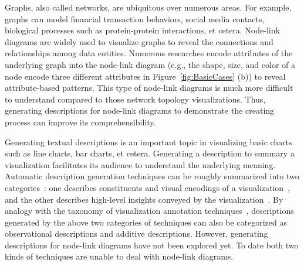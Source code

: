 \maketitle

Graphs, also called networks, are ubiquitous over numerous areas. For example, graphs can model financial transaction behaviors, social media contacts, biological processes such as protein-protein interactions, et cetera.
Node-link diagrams are widely used to visualize graphs to reveal the connections and relationships among data entities.
Numerous researches encode attributes of the underlying graph into the node-link diagram (e.g., the shape, size, and color of a node encode three different attributes in Figure~\ref{fig:BasicCases} (b)) to reveal attribute-based patterns.
This type of node-link diagrams is much more difficult to understand compared to those network topology visualizations. 
Thus, generating descriptions for node-link diagrams to demonstrate the creating process can improve its comprehensibility.

Generating textual descriptions is an important topic in visualizing basic charts such as line charts, bar charts, et cetera.
Generating a description to summary a visualization facilitates its audience to understand the underlying meaning.
Automatic description generation techniques can be roughly summarized into two categories~\cite{DBLP:conf/inlg/ObeidH20}: one describes constituents and visual encodings of a  visualization~\cite{DBLP:journals/coling/MittalMCR98, DBLP:journals/tochi/FerresLST13}, and the other describes high-level insights conveyed by the visualization~\cite{DBLP:conf/apvis/LiuXHWY20, DBLP:conf/inlg/ObeidH20}.
By analogy with the taxonomy of visualization annotation techniques~\cite{DBLP:conf/chi/HullmanDA13}, descriptions generated by the above two categories of techniques can also be categorized as observational descriptions and additive descriptions.
However, generating descriptions for node-link diagrams have not been explored yet.
To date both two kinds of techniques are unable to deal with node-link diagrams.

